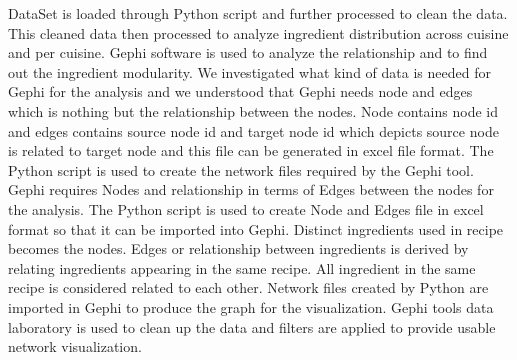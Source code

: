 \documentclass[sigconf]{acmart}
\begin{document}
DataSet is loaded through Python script and further processed to clean the data. This cleaned data then processed to analyze ingredient distribution across cuisine and per cuisine. Gephi software is used to analyze the relationship and to find out the ingredient modularity. We investigated what kind of data is needed for Gephi for the analysis and we understood that Gephi needs node and edges which is nothing but the relationship between the nodes. Node contains node id and edges contains source node id and target node id which depicts source node is related to target node and this file can be generated in excel file format. The Python script is used to create the network files required by the Gephi tool. Gephi requires Nodes and relationship in terms of Edges between the nodes for the analysis. The Python script is used to create Node and Edges file in excel format so that it can be imported into Gephi. Distinct ingredients used in recipe becomes the nodes. Edges or relationship between ingredients is derived by relating ingredients appearing in the same recipe. All ingredient in the same recipe is considered related to each other.
Network files created by Python are imported in Gephi to produce the graph for the visualization. Gephi tools data laboratory is used to clean up the data and filters are applied to provide usable network visualization. 
\end{document}
